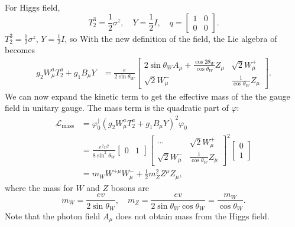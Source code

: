 For Higgs field, 
\begin{equation}
	T^3_2 = \frac{1}{2}\sigma^z, \quad
	Y = \frac{1}{2} I,\quad 
	q = \begin{bmatrix}
		1 & 0 \\ 0 & 0
	\end{bmatrix}.
\end{equation}
$T^3_2 = \frac{1}{2}\sigma^z$, $Y=\frac{1}{2}I$, so 
With the new definition of the field, the Lie algebra of becomes
\begin{equation}
\begin{aligned}
	g_2 W^a_\mu T_2^a + g_1 B_\mu Y 
	&= \frac{e}{2 \sin{\theta_W}} 
	\begin{bmatrix}
		2\sin{\theta_W} A_\mu + \frac{\cos{2\theta_W}}{\cos{\theta_W}} Z_\mu & \sqrt{2} W^+_\mu \\
		\sqrt{2} W_\mu^- & \frac{1}{\cos{\theta_W}} Z_\mu
	\end{bmatrix}.
\end{aligned}
\end{equation}
We can now expand the kinetic term to get the effective mass of the the gauge field in unitary gauge. 
The mass term is the quadratic part of $\varphi$:
\begin{equation}
\begin{aligned}
	\mathcal L_{\mathrm{mass}} 
	&= \varphi_0^\dagger \left(g_2 W^a_\mu T_2^a + g_1 B_\mu Y\right)^2 \varphi_0 \\
	&= \frac{e^2v^2}{8 \sin^2{\theta_W}} 
	\begin{bmatrix}
		0 & 1
	\end{bmatrix} 
	\begin{bmatrix}
		\cdots & \sqrt{2} W^+_\mu \\
		\sqrt{2} W_\mu^- & \frac{1}{\cos{\theta_W}} Z_\mu
	\end{bmatrix}^2
	\begin{bmatrix}
		0 \\ 1
	\end{bmatrix} \\
	&= m_W W^{+\mu} W_\mu^- + \frac{1}{2}m_Z^2 Z^\mu Z_\mu,
\end{aligned}
\end{equation}
where the mass for $W$ and $Z$ bosons are
\begin{equation}
	m_W = \frac{ev}{2 \sin{\theta_W}}, \quad 
	m_Z = \frac{e v}{2\sin{\theta_W}\cos{\theta_W}} = \frac{m_W}{\cos{\theta_W}}.
\end{equation}
Note that the photon field $A_\mu$ does not obtain mass from the Higgs field.



